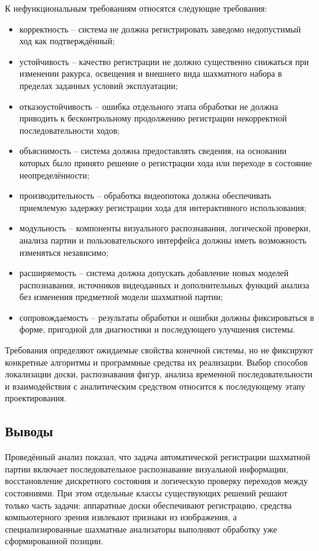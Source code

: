 К нефункциональным требованиям относятся следующие требования:
\begin{itemize}
    \item корректность -- система не должна регистрировать заведомо недопустимый ход как подтверждённый;
    \item устойчивость -- качество регистрации не должно существенно снижаться при изменении ракурса, освещения и внешнего вида шахматного набора в пределах заданных условий эксплуатации;
    \item отказоустойчивость -- ошибка отдельного этапа обработки не должна приводить к бесконтрольному продолжению регистрации некорректной последовательности ходов;
    \item объяснимость -- система должна предоставлять сведения, на основании которых было принято решение о регистрации хода или переходе в состояние неопределённости;
    \item производительность -- обработка видеопотока должна обеспечивать приемлемую задержку регистрации хода для интерактивного использования;
    \item модульность -- компоненты визуального распознавания, логической проверки, анализа партии и пользовательского интерфейса должны иметь возможность изменяться независимо;
    \item расширяемость -- система должна допускать добавление новых моделей распознавания, источников видеоданных и дополнительных функций анализа без изменения предметной модели шахматной партии;
    \item сопровождаемость -- результаты обработки и ошибки должны фиксироваться в форме, пригодной для диагностики и последующего улучшения системы.
\end{itemize}

Требования определяют ожидаемые свойства конечной системы, но не фиксируют конкретные алгоритмы и программные средства их реализации. Выбор способов локализации доски, распознавания фигур, анализа временной последовательности и взаимодействия с аналитическим средством относится к последующему этапу проектирования.

\subsection{Выводы}

Проведённый анализ показал, что задача автоматической регистрации шахматной партии включает последовательное распознавание визуальной информации, восстановление дискретного состояния и логическую проверку переходов между состояниями. При этом отдельные классы существующих решений решают только часть задачи: аппаратные доски обеспечивают регистрацию, средства компьютерного зрения извлекают признаки из изображения, а специализированные шахматные анализаторы выполняют обработку уже сформированной позиции.

